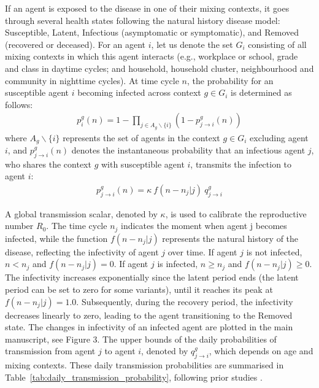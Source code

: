 \documentclass{article}
\begin{document}
\begin{appendices}
If an agent is exposed to the disease in one of their mixing contexts, it goes through several health states following the natural history disease model: Susceptible, Latent, Infectious (asymptomatic or symptomatic), and Removed (recovered or deceased). For an agent $i$, let us denote the set $G_i$ consisting of all mixing contexts in which this agent interacts (e.g., workplace or school, grade and class in daytime cycles; and household, household cluster, neighbourhood and community in nighttime cycles). At time cycle $n$, the probability for an susceptible agent $i$ becoming infected across context $g \in G_i$ is determined as follows:
\begin{eqnarray}
    p^g_i(n) = 1 - \prod_{j \in A_g\backslash\{i\}} (1 - p^g_{j \rightarrow i}(n))
    \label{eq:infection_prob_within_a_group}
\end{eqnarray}
where $A_g\backslash\{i\}$ represents the set of agents in the context $g \in G_i$ excluding agent $i$, and  $p^g_{j \rightarrow i}(n)$ denotes the instantaneous probability that an infectious agent $j$, who shares the context $g$ with susceptible agent $i$, transmits the infection to agent $i$:
\begin{eqnarray}
\label{eq:individual_transmission_prob}
    p^g_{j \rightarrow i}(n) = \kappa \ f(n-n_j | j) \ q^g_{j \rightarrow i}    
\end{eqnarray}

A global transmission scalar, denoted by $\kappa$, is used to calibrate the reproductive number $R_0$. The time cycle $n_j$ indicates the moment when agent j becomes infected, while the function $f(n-n_j| j)$ represents the natural history of the disease, reflecting the infectivity of agent $j$ over time. If agent $j$ is not infected, $n < n_j$ and $f(n-n_j | j)=0$. If agent $j$ is infected, $n \geq n_j$ and $f(n-n_j| j) \geq 0$. The infectivity increases exponentially since the latent period ends (the latent period can be set to zero for some variants),  until it reaches its peak at $f(n-n_j | j) = 1.0$. Subsequently, during the recovery period, the infectivity decreases linearly to zero, leading to the agent transitioning to the Removed state. The changes in infectivity of an infected agent are plotted in the main manuscript, see Figure 3. The upper bounds of the daily probabilities of transmission from agent $j$ to agent $i$, denoted by $q^g_{j \rightarrow i}$, which depends on age and mixing contexts. These daily transmission probabilities are summarised in Table~\ref{tab:daily_transmission_probability}, following prior studies \cite{chang_modelling_2020,zachreson_how_2021,chang_simulating_2022,chang_persistence_2023}.


\end{appendices}
\end{document}
